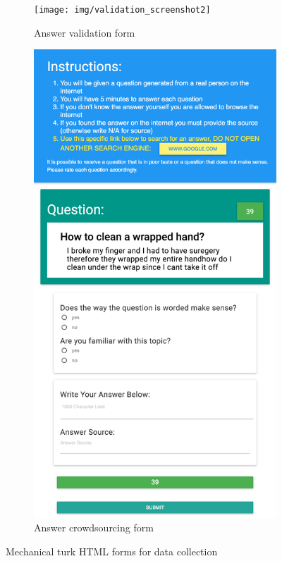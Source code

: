 \documentclass[11pt,letterpaper]{article}
\begin{document}
\begin{figure}[ht!]
\centering
	\begin{subfigure}{.49\textwidth}
	\texttt{[image: img/validation\_screenshot2]}
	\caption{Answer validation form}
	\label{fig:interfaces:validation}
	\end{subfigure}
	\begin{subfigure}{.49\textwidth}
	\centering
	\includegraphics[width=0.9\linewidth]{img/answering_screenshot2}
	\caption{Answer crowdsourcing form}
	\label{fig:interfaces:answer}
	\end{subfigure}
\caption{Mechanical turk HTML forms for data collection}
\label{fig:interfaces}
\end{figure}
\end{document}
